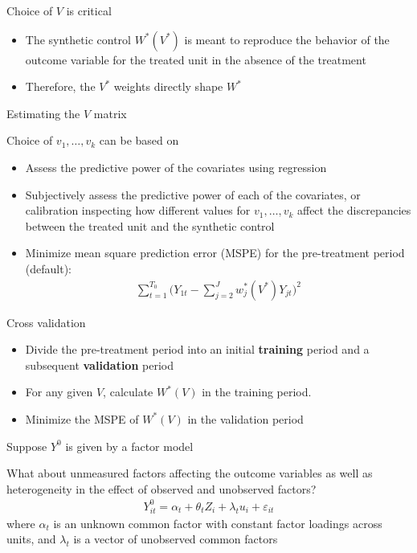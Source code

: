 \documentclass{beamer}
\begin{document}
\begin{frame}{Choice of $V$ is critical}
	
		\begin{itemize}
		\item The synthetic control $W^*(V^*)$ is meant to reproduce the behavior of the outcome variable for the treated unit in the absence of the treatment
		\item Therefore, the $V^*$ weights directly shape $W^*$
		\end{itemize}
\end{frame}

\begin{frame}{Estimating the $V$ matrix}
	
 Choice of $v_1, \dots, v_k$ can be based on
		\begin{itemize}
		\item Assess the predictive power of the covariates using regression
		\item Subjectively assess the predictive power of each of the covariates, or calibration inspecting how different values for $v_1, \dots, v_k$ affect the discrepancies between the treated unit and the synthetic control
		\item Minimize mean square prediction error (MSPE) for the pre-treatment period (default):
			\begin{eqnarray*}
			\sum_{t=1}^{T_0} \bigg(Y_{1t} - \sum_{j=2}^J w_j^*(V^*)Y_{jt} \bigg)^2
			\end{eqnarray*}
		\end{itemize}
\end{frame}

\begin{frame}{Cross validation}

\begin{itemize}
		\item Divide the pre-treatment period into an initial \textbf{training} period and a subsequent \textbf{validation} period
		\item For any given $V$, calculate $W^*(V)$ in the training period.
		\item Minimize the MSPE of $W^*(V)$ in the validation period
\end{itemize}

\end{frame}


\begin{frame}{Suppose $Y^0$ is given by a factor model}

What about unmeasured factors affecting the outcome variables as well as heterogeneity in the effect of observed and unobserved factors?
\begin{eqnarray*}
Y_{it}^0 = \alpha_t + \theta_t Z_i + \lambda_t u_i + \varepsilon_{it}
\end{eqnarray*}where $\alpha_t$ is an unknown common factor with constant factor loadings across units, and $\lambda_t$ is a vector of unobserved common factors

\end{frame}
\end{document}
